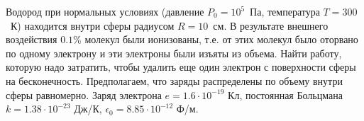 
Водород при нормальных условиях (давление $P_0=10^5$~Па, температура $T=300$~К) находится внутри сферы радиусом $R=10$~см. В результате внешнего воздействия $0.1\%$ молекул 
были ионизованы, т.е. от этих молекул было оторвано по одному электрону и эти электроны были изъяты из объема. Найти работу, которую надо затратить, чтобы удалить еще 
один электрон с поверхности сферы на бесконечность. Предполагаем, что заряды распределены по объему внутри сферы равномерно. Заряд электрона $e = 1.6 \cdot 10^{-19}$ Кл, постоянная 
Больцмана $k=1.38 \cdot 10^{-23}$ Дж/К, $\epsilon_0=8.85 \cdot 10^{-12}$ Ф/м.
